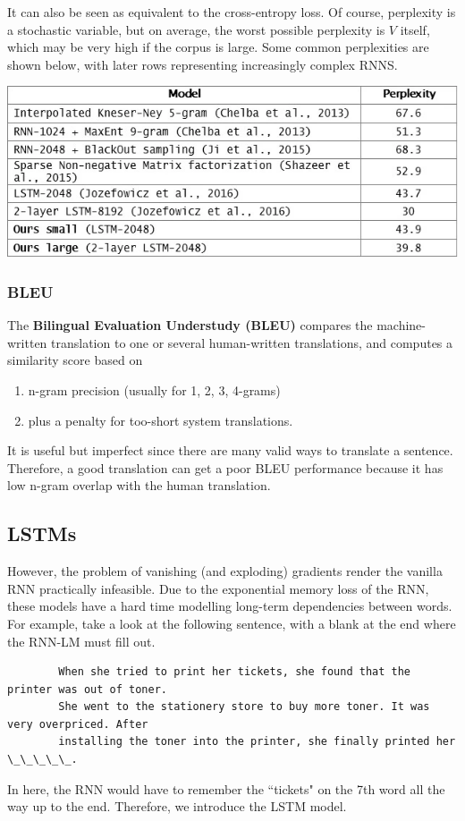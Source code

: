 \documentclass{article}
\begin{document}
      It can also be seen as equivalent to the cross-entropy loss. Of course, perplexity is a stochastic variable, but on average, the worst possible perplexity is $V$ itself, which may be very high if the corpus is large. Some common perplexities are shown below, with later rows representing increasingly complex RNNS. 
      \begin{center}
          \includegraphics[scale=0.5]{img/perplexity.png}
      \end{center}

    \subsubsection{BLEU}

      The \textbf{Bilingual Evaluation Understudy (BLEU)} compares the machine-written translation to one or several human-written translations, and computes a similarity score based on 
      \begin{enumerate}
          \item n-gram precision (usually for 1, 2, 3, 4-grams) 
          \item plus a penalty for too-short system translations. 
      \end{enumerate}
      It is useful but imperfect since there are many valid ways to translate a sentence. Therefore, a good translation can get a poor BLEU performance because it has low n-gram overlap with the human translation. 

  \subsection{LSTMs}

    However, the problem of vanishing (and exploding) gradients render the vanilla RNN practically infeasible. Due to the exponential memory loss of the RNN, these models have a hard time modelling long-term dependencies between words. For example, take a look at the following sentence, with a blank at the end where the RNN-LM must fill out. 
    \begin{lstlisting}
        When she tried to print her tickets, she found that the printer was out of toner. 
        She went to the stationery store to buy more toner. It was very overpriced. After 
        installing the toner into the printer, she finally printed her \_\_\_\_\_. 
    \end{lstlisting}
    In here, the RNN would have to remember the ``tickets" on the 7th word all the way up to the end. Therefore, we introduce the LSTM model. 
    \begin{center}

    \end{center}
\end{document}
